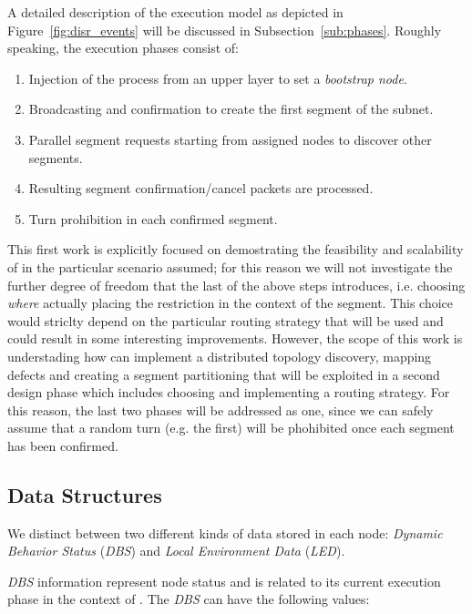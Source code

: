 A detailed description of the \disr{} execution model as depicted in
Figure~\ref{fig:disr_events} will be discussed in
Subsection~\ref{sub:phases}. Roughly speaking, the execution phases consist of:
\begin{enumerate}
\item Injection of the \disr{} process from an upper layer to set a \emph{bootstrap
node}.
\item Broadcasting and confirmation to create the first segment of the subnet.
\item Parallel segment requests starting from assigned nodes to discover other
segments. 
\item Resulting segment confirmation/cancel packets are processed.
\item Turn prohibition in each confirmed segment.
\end{enumerate}

This first work is explicitly focused on demostrating
the feasibility and scalability of \disr{} in the particular scenario
assumed; for this reason we will not investigate the further degree of
freedom that the last of the above steps introduces, i.e. choosing
\emph{where} actually placing the restriction in the context of the
segment. This choice would striclty depend on the particular routing
strategy that will be used and could result in some interesting
improvements. However, the scope of this work is understading how \disr{} can
implement a distributed topology discovery, mapping defects and
creating a segment partitioning that will be exploited in a second
design phase which includes choosing and implementing a routing strategy. For this
reason, the last two phases will be addressed as one, since we can
safely assume that a random turn (e.g. the first) will be phohibited
once each segment has been confirmed.

\subsection{\disr{} Data Structures}
\label{ssec:disr_data}

We distinct between two different kinds of data stored in each node:
\emph{Dynamic Behavior Status} (\emph{DBS}) and \emph{Local
Environment Data} (\emph{LED}).

\emph{DBS} information represent node status and is related to its
current execution phase in the context of \disr{}.
The \emph{DBS} can have the following values:

